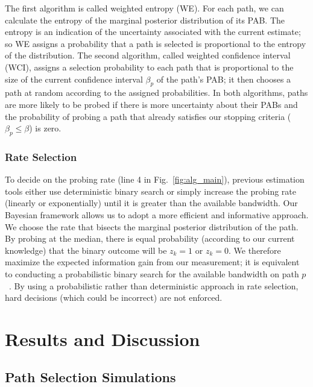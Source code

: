\documentclass[final,5p,times,twocolumn]{elsarticle}
\begin{document}
The first algorithm is called weighted entropy (WE).  For each path, we can calculate the entropy of the marginal posterior distribution of its PAB.  The entropy is an indication of the uncertainty associated with the current estimate; so WE assigns a probability that a path is selected is proportional to the entropy of the distribution.
The second algorithm, called weighted confidence interval (WCI), assigns a selection probability to each path that is proportional to the size of the current confidence interval $\beta_p$ of the path's PAB; it then chooses a path at random according to the assigned probabilities. 
In both algorithms, paths are more likely to be probed if there is more uncertainty about their PABs and the probability of probing a path that already satisfies our stopping criteria ($\beta_p \leq \beta$) is zero.







\subsubsection{Rate Selection}
	
To decide on the probing rate (line 4 in Fig.~\ref{fig:alg_main}), previous estimation tools either use deterministic binary search or simply increase the probing rate (linearly or exponentially) until it is greater than the available bandwidth.  
Our Bayesian framework allows us to adopt a more efficient and informative approach.   We choose the rate that bisects the marginal posterior distribution of the path.
By probing at the median, there is equal probability (according to our current knowledge) that the binary outcome will be $z_k = 1$ or $z_k=0$.  
We therefore maximize the expected information gain from our measurement; it is equivalent to conducting a probabilistic binary search for the available bandwidth on path $p$~\cite{cas:07}.  
By using a probabilistic rather than deterministic approach in rate selection, hard decisions (which could be incorrect) are not enforced.


\section{Results and Discussion}
\label{sec:res}

\subsection{Path Selection Simulations}
\label{ssec:sim}
\end{document}
